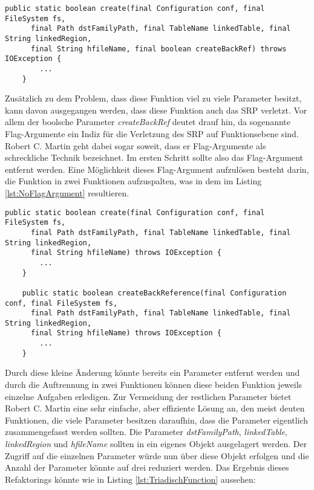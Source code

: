 \begin{lstlisting}[language={[Sharp]C}, caption=Beispiele für Rückgabe eines Null Wertes, label=lst:PolyadischFunction]
  public static boolean create(final Configuration conf, final FileSystem fs,
      final Path dstFamilyPath, final TableName linkedTable, final String linkedRegion,
      final String hfileName, final boolean createBackRef) throws IOException {
		...
	}
\end{lstlisting}

\SuperPar Zusätzlich zu dem Problem, dass diese Funktion viel zu viele Parameter besitzt, kann davon ausgegangen werden, dass diese Funktion auch das SRP verletzt. Vor allem der boolsche Parameter \textit{createBackRef} deutet drauf hin, da sogenannte Flag-Argumente ein Indiz für die Verletzung des SRP auf Funktionsebene sind. Robert C. Martin geht dabei sogar soweit, dass er Flag-Argumente als schreckliche Technik bezeichnet. Im ersten Schritt sollte also das Flag-Argument entfernt werden. Eine Möglichkeit dieses Flag-Argument aufzulösen besteht darin, die Funktion in zwei Funktionen aufzuspalten, was in dem im Listing  \ref{lst:NoFlagArgument} resultieren.

\begin{lstlisting}[language={[Sharp]C}, caption=Beispiele für Eliminierung des Flag Arguments, label=lst:NoFlagArgument]
   public static boolean create(final Configuration conf, final FileSystem fs,
      final Path dstFamilyPath, final TableName linkedTable, final String linkedRegion,
      final String hfileName) throws IOException {
		...
	}
	
	public static boolean createBackReference(final Configuration conf, final FileSystem fs,
      final Path dstFamilyPath, final TableName linkedTable, final String linkedRegion,
      final String hfileName) throws IOException {
		...
	}
\end{lstlisting}

\SuperPar Durch diese kleine Änderung könnte bereits ein Parameter entfernt werden und durch die Auftrennung in zwei Funktionen können diese beiden Funktion jeweils einzelne Aufgaben erledigen. Zur Vermeidung der restlichen Parameter bietet Robert C. Martin eine sehr einfache, aber effiziente Lösung an, den meist deuten Funktionen, die viele Parameter besitzen daraufhin, dass die Parameter eigentlich zusammengefasst werden sollten. Die Parameter \textit{dstFamilyPath}, \textit{linkedTable}, \textit{linkedRegion} und \textit{hfileName} sollten in ein eigenes Objekt ausgelagert werden. Der Zugriff auf die einzelnen Parameter würde nun über diese Objekt erfolgen und die Anzahl der Parameter könnte auf drei reduziert werden. Das Ergebnis dieses Refaktorings könnte wie in Listing \ref{lst:TriadischFunction} aussehen:

